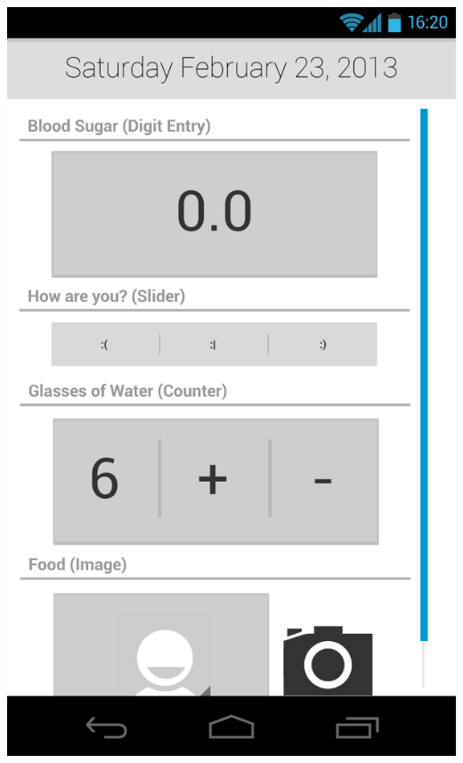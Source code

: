 \documentclass[pdftex,12pt,a4paper]{report}
\begin{document}
\includegraphics[scale=0.18]{Screens/03-Add--No-Selection.png}
\end{document}
